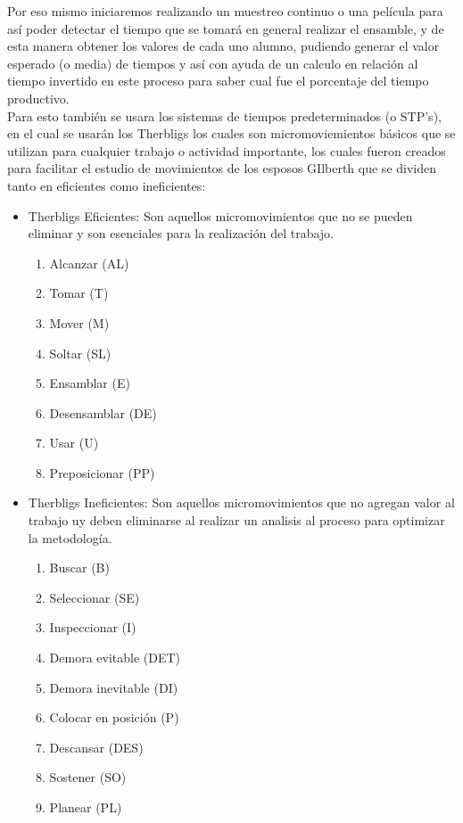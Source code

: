         Por eso mismo iniciaremos realizando un muestreo continuo o una película para así poder detectar el tiempo que se tomará en general realizar el ensamble, y de esta manera obtener los valores de cada uno alumno, pudiendo generar el valor esperado (o media) de tiempos y así con ayuda de un calculo en relación al tiempo invertido en este proceso para saber cual fue el porcentaje del tiempo productivo.
        \\Para esto también se usara los sistemas de tiempos predeterminados (o STP's), en el cual se usarán los Therbligs los cuales son micromoviemientos básicos que se utilizan para cualquier trabajo o actividad importante, los cuales fueron creados para facilitar el estudio de movimientos de los esposos GIlberth que se dividen tanto en eficientes como ineficientes:
            \begin{itemize}
        \item Therbligs Eficientes: Son aquellos micromovimientos que no se pueden eliminar y son esenciales para la realización del trabajo.
            \begin{enumerate}
                \item Alcanzar (AL)
                \item Tomar (T)
                \item Mover (M)
                \item Soltar (SL)
                \item Ensamblar (E)
                \item Desensamblar (DE)
                \item Usar (U)
                \item Preposicionar (PP)
            \end{enumerate}
        \item Therbligs Ineficientes: Son aquellos micromovimientos que no agregan valor al trabajo uy deben eliminarse al realizar un analisis al proceso para optimizar la metodología.
            \begin{enumerate}
                \item Buscar (B)
                \item Seleccionar (SE)
                \item Inspeccionar (I)
                \item Demora evitable (DET)
                \item Demora inevitable (DI)
                \item Colocar en posición (P)
                \item Descansar (DES)
                \item Sostener (SO)
                \item Planear (PL)
            \end{enumerate}
              \end{itemize}
              
